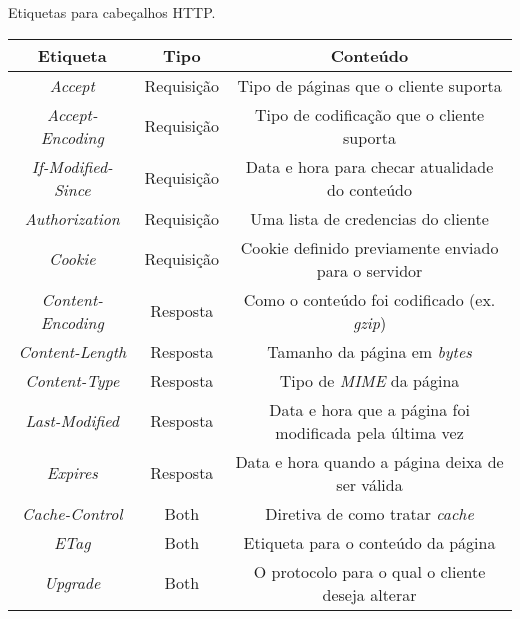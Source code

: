 \begin{quadro}[!htb]
	\centering
	\caption{Etiquetas para cabeçalhos HTTP.\label{qua:cabecalhoshttp}}
	\begin{tabular}{| c | c | c |}
		\hline
		\textbf{Etiqueta} & \textbf{Tipo} & \textbf{Conteúdo}                                       \\
		\hline
		\textit{Accept}             & Requisição    & Tipo de páginas que o cliente suporta                   \\
		\hline
		\textit{Accept-Encoding}    & Requisição    & Tipo de codificação que o cliente suporta               \\
		\hline
		\textit{If-Modified-Since}  & Requisição    & Data e hora para checar atualidade do conteúdo          \\
		\hline
		\textit{Authorization}      & Requisição    & Uma lista de credencias do cliente                      \\
		\hline
		\textit{Cookie}             & Requisição    & Cookie definido previamente enviado para o servidor     \\
		\hline
		\textit{Content-Encoding}   & Resposta      & Como o conteúdo foi codificado (ex. \textit{gzip})               \\
		\hline
		\textit{Content-Length}     & Resposta      & Tamanho da página em \textit{bytes}                              \\
		\hline
		\textit{Content-Type}       & Resposta      & Tipo de \textit{MIME} da página                                  \\
		\hline
		\textit{Last-Modified}      & Resposta      & Data e hora que a página foi modificada pela última vez \\
		\hline
		\textit{Expires}            & Resposta      & Data e hora quando a página deixa de ser válida         \\
		\hline
		\textit{Cache-Control}      & Both          & Diretiva de como tratar \textit{cache}                           \\
		\hline
		\textit{ETag}               & Both          & Etiqueta para o conteúdo da página                      \\
		\hline
		\textit{Upgrade}            & Both          & O protocolo para o qual o cliente deseja alterar        \\	
		\hline
	\end{tabular}
\end{quadro}